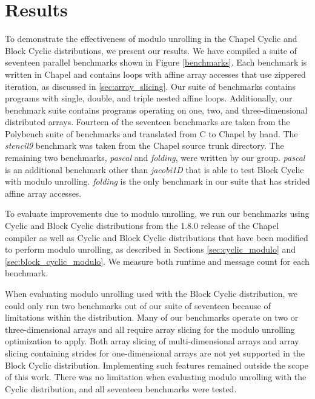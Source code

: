 \section{Results}\label{sec:results}

To demonstrate the effectiveness of modulo unrolling in the Chapel Cyclic and Block Cyclic distributions, we present our results. We have compiled a suite of seventeen parallel benchmarks shown in Figure \ref{benchmarks}. Each benchmark is written in Chapel and contains loops with affine array accesses that use zippered iteration, as discussed in \ref{sec:array_slicing}. Our suite of benchmarks contains programs with single, double, and triple nested affine loops. Additionally, our benchmark suite contains programs operating on one, two, and three-dimensional distributed arrays. Fourteen of the seventeen benchmarks are taken from the Polybench suite of benchmarks and translated from C to Chapel by hand. The \textit{stencil9} benchmark was taken from the Chapel source trunk directory. The remaining two benchmarks, \textit{pascal} and \textit{folding}, were written by our group. \textit{pascal} is an additional benchmark other than \textit{jacobi1D} that is able to test Block Cyclic with modulo unrolling. \textit{folding} is the only benchmark in our suite that has strided affine array accesses. 

To evaluate improvements due to modulo unrolling, we run our benchmarks using Cyclic and Block Cyclic distributions from the 1.8.0 release of the Chapel compiler as well as Cyclic and Block Cyclic distributions that have been modified to perform modulo unrolling, as described in Sections \ref{sec:cyclic_modulo} and \ref{sec:block_cyclic_modulo}. We measure both runtime and message count for each benchmark. 

When evaluating modulo unrolling used with the Block Cyclic distribution, we could only run two benchmarks out of our suite of seventeen because of limitations within the distribution. Many of our benchmarks operate on two or three-dimensional arrays and all require array slicing for the modulo unrolling optimization to apply. Both array slicing of multi-dimensional arrays and array slicing containing strides for one-dimensional arrays are not yet supported in the Block Cyclic distribution. Implementing such features remained outside the scope of this work. There was no limitation when evaluating modulo unrolling with the Cyclic distribution, and all seventeen benchmarks were tested.

